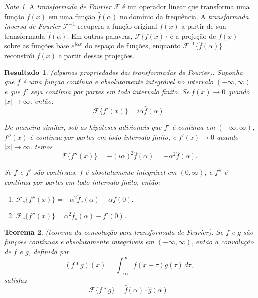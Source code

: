 \documentclass{article}
\theoremstyle{plain}
\newtheorem{thm}{Teorema}[section]
\newtheorem{res}[thm]{Resultado}
\theoremstyle{definition}
\theoremstyle{remark}
\newtheorem*{rem}{Nota}
\begin{document}
\begin{rem}
    A \emph{transformada de Fourier} \(\mathcal{F}\) é um operador linear que transforma uma função \(f(x)\) em uma função \(\widehat{f}(\alpha)\) no domínio da frequência. A \emph{transformada inversa de Fourier} \(\mathcal{F}^{-1}\) recupera a função original \(f(x)\) a partir de sua transformada \(\widehat{f}(\alpha)\).
    Em outras palavras, \(\mathcal{F}\{f(x)\}\) é a projeção de \(f(x)\) sobre as funções base \(e^{i\alpha x}\) do espaço de funções, enquanto \(\mathcal{F}^{-1}\{\widehat{f}(\alpha)\}\) reconstrói \(f(x)\) a partir dessas projeções.
\end{rem}

\begin{res} (algumas propriedades das transformadas de Fourier).
    Suponha que \(f\) é uma função contínua e absolutamente integrável no intervalo \((-\infty, \infty)\) e que \(f'\) seja contínua por partes em todo intervalo finito. Se \(f(x) \to 0\) quando \(|x| \to \infty\), então:
    \begin{equation}
        \mathcal{F}\{f'(x)\} = i\alpha \widehat{f}(\alpha).
    \end{equation}

    De maneira similar, sob as hipóteses adicionais que \(f'\) é contínua em \((-\infty, \infty)\), \(f''(x)\) é contínua por partes em todo intervalo finito, e \(f'(x) \to 0\) quando \(|x| \to \infty\), temos 
    \begin{equation}
        \mathcal{F}\{f''(x)\} = -(i\alpha)^2 \widehat{f}(\alpha) = -\alpha^2 \widehat{f}(\alpha).
    \end{equation}

    Se \(f\) e \(f'\) são contínuas, \(f\) é absolutamente integrável em \((0, \infty)\), e \(f''\) é contínua por partes em todo intervalo finito, então:
    \begin{enumerate}
        \item [\textup{(a)}] \(\mathcal{F}_s\{f''(x)\} = -\alpha^2 \widehat{f}_c(\alpha) + \alpha f(0)\).
        \item [\textup{(b)}] \(\mathcal{F}_c\{f''(x)\} = \alpha^2 \widehat{f}_s(\alpha) - f'(0)\).
    \end{enumerate}
\end{res}

\begin{thm} (teorema da convolução para transformada de Fourier).
    Se \(f\) e \(g\) são funções contínuas e absolutamente integráveis em \((-\infty, \infty)\), então a convolução de \(f\) e \(g\), definida por
    \begin{equation}
        (f * g)(x) = \int_{-\infty}^{\infty} f(x - \tau) g(\tau) \, d\tau,
    \end{equation}
    \noindent satisfaz
    \begin{equation}
        \mathcal{F}\{f * g\} = \widehat{f}(\alpha) \cdot \widehat{g}(\alpha).
    \end{equation}
\end{thm}
\end{document}
